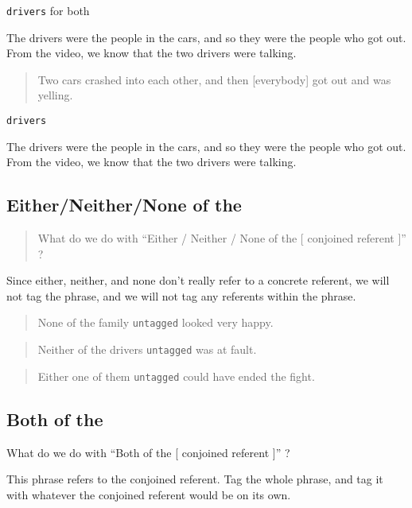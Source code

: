 \documentclass[
]{book}
\begin{document}
\texttt{drivers} for both

The drivers were the people in the cars,
and so they were the people who got out.
From the video, we know that the two drivers were talking.

\begin{quote}
Two cars crashed into each other,
and then {[}everybody{]} got out and was yelling.
\end{quote}

\texttt{drivers}

The drivers were the people in the cars,
and so they were the people who got out.
From the video, we know that the two drivers were talking.

\hypertarget{eitherneithernone-of-the}{%
\subsection{Either/Neither/None of the}\label{eitherneithernone-of-the}}

\begin{quote}
What do we do with
``Either / Neither / None of the {[} conjoined referent {]}'' ?
\end{quote}

Since either, neither, and none don't really refer to a concrete referent,
we will not tag the phrase,
and we will not tag any referents within the phrase.

\begin{quote}
None of the family \texttt{untagged} looked very happy.
\end{quote}

\begin{quote}
Neither of the drivers \texttt{untagged} was at fault.
\end{quote}

\begin{quote}
Either one of them \texttt{untagged} could have ended the fight.
\end{quote}

\hypertarget{both-of-the}{%
\subsection{Both of the}\label{both-of-the}}

What do we do with ``Both of the {[} conjoined referent {]}'' ?

This phrase refers to the conjoined referent. Tag the whole phrase, and tag it with whatever the conjoined referent would be on its own.
\end{document}
